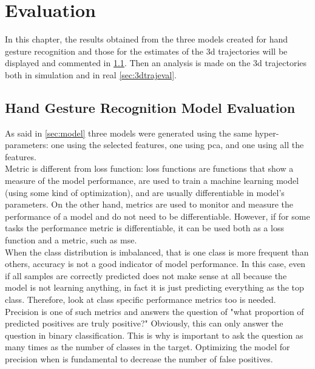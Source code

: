 \chapter{Evaluation}
\label{chap:evaluation}
In this chapter, the results obtained from the three models created for hand gesture recognition and those for the estimates of the 3d trajectories will be displayed and commented in \ref{sec:handeval}. Then an analysis is made on the \gls{3d} trajectories both in simulation and in real \ref{sec:3dtrajeval}. 

\section{Hand Gesture Recognition Model Evaluation}
\label{sec:handeval}
As said in \ref{sec:model} three models were generated using the same hyper-parameters: one using the selected features, one using \gls{pca}, and one using all the features. \\ 

\noindent Metric is different from loss function: loss functions are functions that show a measure of the model performance, are used to train a machine learning model (using some kind of optimization), and are usually differentiable in model’s parameters. On the other hand, metrics are used to monitor and measure the performance of a model and do not need to be differentiable. However, if for some tasks the performance metric is differentiable, it can be used both as a loss function and a metric, such as \gls{mse}. \\

\noindent When the class distribution is imbalanced, that is one class is more frequent than others, accuracy is not a good indicator of model performance. In this case, even if all samples are correctly predicted does not make sense at all because the model is not learning anything, in fact it is just predicting everything as the top class. Therefore, look at class specific performance metrics too is needed. \\

\noindent Precision is one of such metrics and answers the question of "what proportion of predicted positives are truly positive?" Obviously, this can only answer the question in binary classification. This is why is important to ask the question as many times as the number of classes in the target. Optimizing the model for precision when is fundamental to decrease the number of false positives. \\ 

